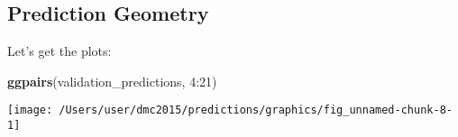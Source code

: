 \documentclass[10pt]{report}
\newenvironment{Shaded}{}{}
\newcommand{\KeywordTok}[1]{\textcolor[rgb]{0.00,0.44,0.13}{\textbf{{#1}}}}
\newcommand{\DecValTok}[1]{\textcolor[rgb]{0.25,0.63,0.44}{{#1}}}
\newcommand{\NormalTok}[1]{{#1}}
\begin{document}
\subsection{Prediction Geometry}\label{prediction-geometry}

Let's get the plots:

\begin{Shaded}
\begin{Highlighting}[]
\KeywordTok{ggpairs}\NormalTok{(validation_predictions, }\DecValTok{4}\NormalTok{:}\DecValTok{21}\NormalTok{)}
\end{Highlighting}
\end{Shaded}

\begin{center}\texttt{[image: /Users/user/dmc2015/predictions/graphics/fig\_unnamed-chunk-8-1]} \end{center}
\end{document}
